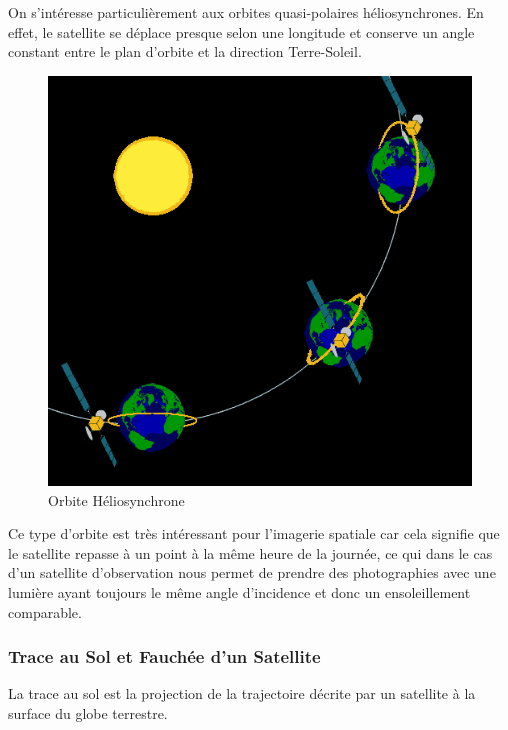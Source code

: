 \documentclass[a4paper, 11pt]{report}
\begin{document}
On s'intéresse particulièrement aux orbites quasi-polaires héliosynchrones. En effet, le satellite se déplace presque selon une longitude et conserve un angle constant entre le plan d'orbite et la direction Terre-Soleil.
\begin{figure}[H]
	\begin{center}
		\includegraphics[scale=0.3]{Images/Orbite_Heliosynchrone.png}
		\caption{Orbite Héliosynchrone}
	\end{center}
\end{figure}
Ce type d'orbite est très intéressant pour l'imagerie spatiale car cela signifie que le satellite repasse à un point à la même heure de la journée, ce qui dans le cas d'un satellite d'observation nous permet de prendre des photographies avec une lumière ayant toujours le même angle d'incidence et donc un ensoleillement comparable.
\subsubsection{Trace au Sol et Fauchée d'un Satellite}
La trace au sol est la projection de la trajectoire décrite par un satellite à la surface du globe terrestre.
\end{document}
